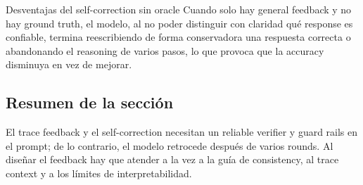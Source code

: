 \begin{warningbox}{Desventajas del self-correction sin oracle}
Cuando solo hay general feedback y no hay ground truth, el modelo, al no poder distinguir con claridad qué response es confiable, termina reescribiendo de forma conservadora una respuesta correcta o abandonando el reasoning de varios pasos, lo que provoca que la accuracy disminuya en vez de mejorar.
\end{warningbox}

\subsection{Resumen de la sección}
El trace feedback y el self-correction necesitan un reliable verifier y guard rails en el prompt; de lo contrario, el modelo retrocede después de varios rounds. Al diseñar el feedback hay que atender a la vez a la guía de consistency, al trace context y a los límites de interpretabilidad.
